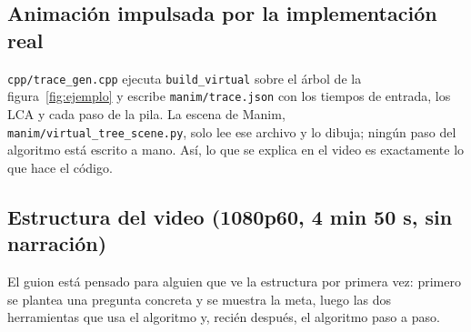 \documentclass[11pt,a4paper]{article}
\theoremstyle{plain}
\begin{document}
\subsection*{Animación impulsada por la implementación real}
\texttt{cpp/trace\_gen.cpp} ejecuta \texttt{build\_virtual} sobre el árbol de la
figura~\ref{fig:ejemplo} y escribe \texttt{manim/trace.json} con los tiempos de entrada, los
LCA y cada paso de la pila. La escena de Manim, \texttt{manim/virtual\_tree\_scene.py},
solo lee ese archivo y lo dibuja; ningún paso del algoritmo está escrito a mano. Así, lo que se
explica en el video es exactamente lo que hace el código.

\subsection*{Estructura del video (1080p60, 4 min 50 s, sin narración)}
El guion está pensado para alguien que ve la estructura por primera vez: primero se plantea
una pregunta concreta y se muestra la meta, luego las dos herramientas que usa el algoritmo
y, recién después, el algoritmo paso a paso.
\end{document}
